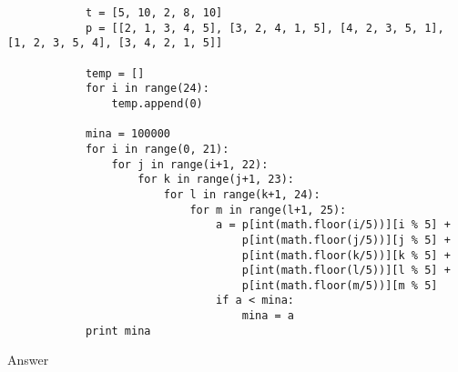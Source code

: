 \documentclass[11pt, letterpaper]{article}
\begin{document}
\begin{enumerate}
\begin{enumerate}
\begin{lstlisting}
            t = [5, 10, 2, 8, 10]
            p = [[2, 1, 3, 4, 5], [3, 2, 4, 1, 5], [4, 2, 3, 5, 1], [1, 2, 3, 5, 4], [3, 4, 2, 1, 5]]

            temp = []
            for i in range(24):
                temp.append(0)

            mina = 100000
            for i in range(0, 21):
                for j in range(i+1, 22):
                    for k in range(j+1, 23):
                        for l in range(k+1, 24):
                            for m in range(l+1, 25):
                                a = p[int(math.floor(i/5))][i % 5] +
                                    p[int(math.floor(j/5))][j % 5] +
                                    p[int(math.floor(k/5))][k % 5] +
                                    p[int(math.floor(l/5))][l % 5] +
                                    p[int(math.floor(m/5))][m % 5]
                                if a < mina:
                                    mina = a
            print mina
          \end{lstlisting}
          Answer 
      \end{enumerate}
  \end{enumerate}
\end{document}

